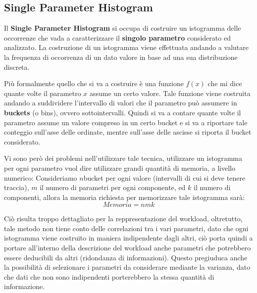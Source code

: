 \subsection{Single Parameter Histogram}
Il \textbf{Single Parameter Histogram} si occupa di costruire un istogramma delle occorrenze che vada a caratterizzare il \textbf{singolo parametro} considerato ed analizzato. La costruzione di un istogramma viene effettuata andando a valutare la frequenza di occorrenza di un dato valore in base ad una sua distribuzione discreta. 

Più formalmente quello che si va a costruire è una funzione \(f(x)\) che mi dice quante volte il parametro \(x\) assume un certo valore. Tale funzione viene costruita andando a suddividere l'intervallo di valori che il parametro può assumere in \textbf{buckets} (o bins), ovvero sottointervalli. Quindi si va a contare quante volte il parametro assume un valore compreso in un certo bucket e si va a riportare tale conteggio sull'asse delle ordinate, mentre sull'asse delle ascisse si riporta il bucket considerato.

Vi sono però dei problemi nell'utilizzare tale tecnica, utilizzare un istogramma per ogni parametro vuol dire utilizzare grandi quantità di memoria, a livello numerico:
Consideriamo \(n \)bucket  per ogni valore (intervalli di cui si deve tenere traccia), \(m\) il numero di parametri per ogni componente, ed \(k\) il numero di componenti, allora la memoria richiesta per memorizzare tale istogramma sarà:
\[
Memoria = n m k
\]

Ciò risulta troppo dettagliato per la reppresentazione del workload, oltretutto, tale metodo non tiene conto delle correlazioni tra i vari parametri, dato che ogni istogramma viene costruito in maniera indipendente dagli altri, ciò porta quindi a portare all'interno della descrizione del workload anche parametri che potrebbero essere deducibili da altri (ridondanza di informazioni). Questo pregiuduca anche la possibilità di selezionare i parametri da considerare mediante la varianza, dato che dati che non sono indipendenti porterebbero la stessa quantità di informazione.

